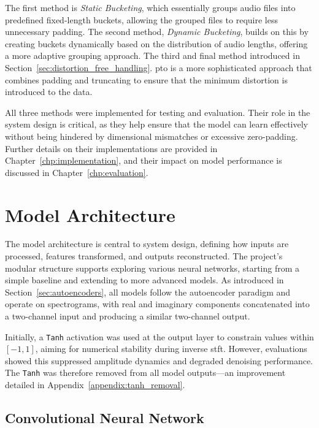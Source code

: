 The first method is \textit{Static Bucketing}, which essentially groups audio files into predefined fixed-length buckets, allowing the grouped files to require less unnecessary padding. The second method, \textit{Dynamic Bucketing}, builds on this by creating buckets dynamically based on the distribution of audio lengths, offering a more adaptive grouping approach. The third and final method introduced in Section~\ref{sec:distortion_free_handling}. \gls{pto} is a more sophisticated approach that combines padding and truncating to ensure that the minimum distortion is introduced to the data.

All three methods were implemented for testing and evaluation. Their role in the system design is critical, as they help ensure that the model can learn effectively without being hindered by dimensional mismatches or excessive zero-padding. Further details on their implementations are provided in Chapter~\ref{chp:implementation}, and their impact on model performance is discussed in Chapter~\ref{chp:evaluation}.

\section{Model Architecture}
\label{sec:model_architecture}

The model architecture is central to system design, defining how inputs are processed, features transformed, and outputs reconstructed. The project’s modular structure supports exploring various neural networks, starting from a simple baseline and extending to more advanced models. As introduced in Section~\ref{sec:autoencoders}, all models follow the autoencoder paradigm and operate on spectrograms, with real and imaginary components concatenated into a two-channel input and producing a similar two-channel output.

Initially, a \texttt{Tanh} activation was used at the output layer to constrain values within $[-1, 1]$, aiming for numerical stability during inverse \gls{stft}. However, evaluations showed this suppressed amplitude dynamics and degraded denoising performance. The \texttt{Tanh} was therefore removed from all model outputs—an improvement detailed in Appendix~\ref{appendix:tanh_removal}.

\subsection{Convolutional Neural Network}
\label{sec:cnn}

